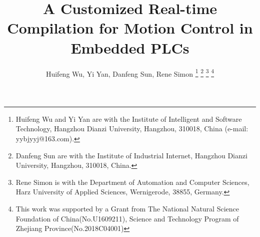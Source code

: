 \documentclass[journal]{IEEEtran}
\begin{document}
%
\title{A Customized Real-time Compilation for Motion Control in Embedded PLCs}
%
%
%

\author{Huifeng Wu,
        Yi Yan, Danfeng Sun, Rene Simon%
\thanks{Huifeng Wu and Yi Yan are with the Institute of Intelligent and Software Technology, Hangzhou Dianzi University, Hangzhou, 310018, China (e-mail: yybjyyj@163.com).}%
\thanks{Danfeng Sun are with the Institute of Industrial Internet, Hangzhou Dianzi University, Hangzhou, 310018, China.}
\thanks{Rene Simon is with the Department of Automation and Computer Sciences, Harz University of Applied Sciences, Wernigerode, 38855, Germany.}
\thanks{This work was supported by a Grant from The National Natural Science Foundation of China(No.U1609211), Science and Technology Program of Zhejiang Province(No.2018C04001)}
}%

%
%
\end{document}
